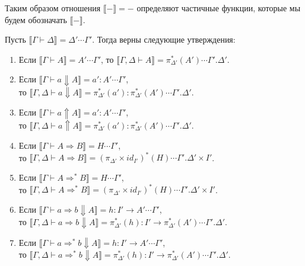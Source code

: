 \documentclass{amsart}
\theoremstyle{definition}
\theoremstyle{remark}
\newcommand{\red}{\Rightarrow}
\renewcommand{\ll}{\llbracket}
\newcommand{\rr}{\rrbracket}
\numberwithin{figure}{section}
\begin{document}
Таким образом отношения $\ll - \rr = -$ определяют частичные функции, которые мы будем обозначать $\ll - \rr$.

\begin{lem}
Пусть $\ll \Gamma \vdash \Delta\rr = \Delta' \dotsb \Gamma'$.
Тогда верны следующие утверждения:
\begin{enumerate}
\item Если $\ll \Gamma \vdash A \rr = A' \dotsb \Gamma'$, то $\ll \Gamma, \Delta \vdash A \rr = \pi_{\Delta'}^*(A') \dotsb \Gamma'.\Delta'$.
\item Если $\ll \Gamma \vdash a \Downarrow A \rr = a' : A' \dotsb \Gamma'$, \\
    то $\ll \Gamma, \Delta \vdash a \Downarrow A \rr = \pi_{\Delta'}^*(a') : \pi_{\Delta'}^*(A') \dotsb \Gamma'.\Delta'$.
\item Если $\ll \Gamma \vdash a \Uparrow A \rr = a' : A' \dotsb \Gamma'$, \\
    то $\ll \Gamma, \Delta \vdash a \Uparrow A \rr = \pi_{\Delta'}^*(a') : \pi_{\Delta'}^*(A') \dotsb \Gamma'.\Delta'$.
\item Если $\ll \Gamma \vdash A \red B \rr = H \dotsb \Gamma'$, \\
    то $\ll \Gamma, \Delta \vdash A \red B \rr = (\pi_{\Delta'} \times id_{I'})^*(H) \dotsb \Gamma'.\Delta' \times I'$.
\item Если $\ll \Gamma \vdash A \red^* B \rr = H \dotsb \Gamma'$, \\
    то $\ll \Gamma, \Delta \vdash A \red^* B \rr = (\pi_{\Delta'} \times id_{I'})^*(H) \dotsb \Gamma'.\Delta' \times I'$.
\item Если $\ll \Gamma \vdash a \red b \Downarrow A \rr = h : I' \to A' \dotsb \Gamma'$, \\
    то $\ll \Gamma, \Delta \vdash a \red b \Downarrow A \rr = \pi_{\Delta'}^*(h) : I' \to \pi_{\Delta'}^*(A') \dotsb \Gamma'.\Delta'$.
\item Если $\ll \Gamma \vdash a \red^* b \Downarrow A \rr = h : I' \to A' \dotsb \Gamma'$, \\
    то $\ll \Gamma, \Delta \vdash a \red^* b \Downarrow A \rr = \pi_{\Delta'}^*(h) : I' \to \pi_{\Delta'}^*(A') \dotsb \Gamma'.\Delta'$.
\end{enumerate}
\end{lem}
\end{document}
